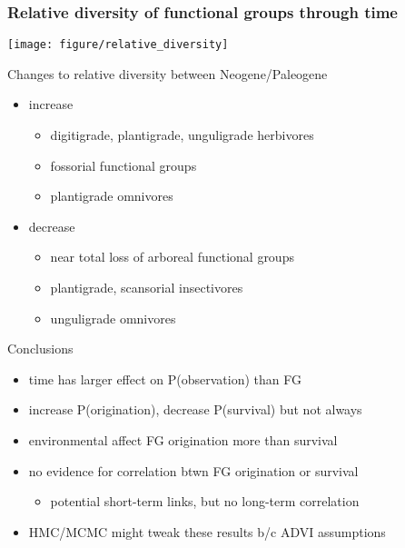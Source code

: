 \documentclass{beamer}
\begin{document}
\begin{frame}
  \frametitle{Relative diversity of functional groups through time}
  \begin{center}
    \texttt{[image: figure/relative\_diversity]}
  \end{center}
\end{frame}

\begin{frame}
  \begin{block}{Changes to relative diversity between Neogene/Paleogene}
    \begin{itemize}
      \item \alert{increase}
        \begin{itemize}
          \item digitigrade, plantigrade, unguligrade herbivores
          \item fossorial functional groups
          \item plantigrade omnivores
        \end{itemize}
      \item \alert{decrease}
        \begin{itemize}
          \item near total loss of arboreal functional groups
          \item plantigrade, scansorial insectivores
          \item unguligrade omnivores
        \end{itemize}
    \end{itemize}
  \end{block}
\end{frame}

\begin{frame}
  \begin{alertblock}{Conclusions}
    \begin{itemize}
      \item time has larger effect on P(observation) than FG 
      \item increase P(origination), decrease P(survival) but not always 
      \item environmental affect FG origination more than survival
      \item no evidence for correlation btwn FG origination or survival
        \begin{itemize}
          \item potential short-term links, but no long-term correlation
        \end{itemize}
      \item HMC/MCMC might tweak these results b/c ADVI assumptions
    \end{itemize}
  \end{alertblock}
\end{frame}
\end{document}
